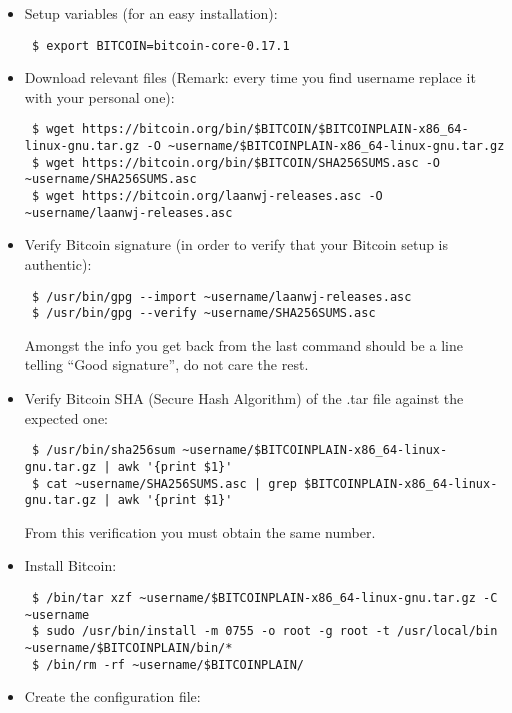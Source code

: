 \begin{itemize}
\item Setup variables (for an easy installation):
\bigskip
\begin{lstlisting}
 $ export BITCOIN=bitcoin-core-0.17.1
\end{lstlisting}
\item Download relevant files (Remark: every time you find username replace it with your personal one):
\bigskip
\begin{lstlisting}
 $ wget https://bitcoin.org/bin/$BITCOIN/$BITCOINPLAIN-x86_64-linux-gnu.tar.gz -O ~username/$BITCOINPLAIN-x86_64-linux-gnu.tar.gz
 $ wget https://bitcoin.org/bin/$BITCOIN/SHA256SUMS.asc -O ~username/SHA256SUMS.asc
 $ wget https://bitcoin.org/laanwj-releases.asc -O ~username/laanwj-releases.asc
\end{lstlisting}
\item Verify Bitcoin signature (in order to verify that your Bitcoin setup is authentic):
\bigskip
\begin{lstlisting}
 $ /usr/bin/gpg --import ~username/laanwj-releases.asc
 $ /usr/bin/gpg --verify ~username/SHA256SUMS.asc
\end{lstlisting}
Amongst the info you get back from the last command should be a line telling \enquote{Good signature}, do not care the rest.
\item Verify Bitcoin SHA (Secure Hash Algorithm) of the .tar file against the expected one:
\bigskip
\begin{lstlisting}
 $ /usr/bin/sha256sum ~username/$BITCOINPLAIN-x86_64-linux-gnu.tar.gz | awk '{print $1}'
 $ cat ~username/SHA256SUMS.asc | grep $BITCOINPLAIN-x86_64-linux-gnu.tar.gz | awk '{print $1}'
\end{lstlisting}
From this verification you must obtain the same number.
\item Install Bitcoin:
\bigskip
\begin{lstlisting}
 $ /bin/tar xzf ~username/$BITCOINPLAIN-x86_64-linux-gnu.tar.gz -C ~username
 $ sudo /usr/bin/install -m 0755 -o root -g root -t /usr/local/bin ~username/$BITCOINPLAIN/bin/*
 $ /bin/rm -rf ~username/$BITCOINPLAIN/
\end{lstlisting}
\item Create the configuration file:


\end{itemize}
